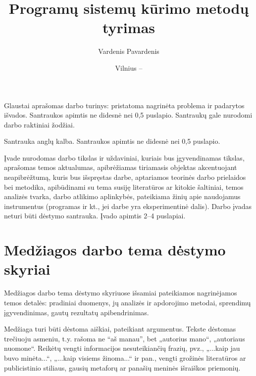 \documentclass{VUMIFPSbakalaurinis}
\institute{Informatikos institutas}  %
\title{Programų sistemų kūrimo metodų tyrimas}
\author{Vardenis Pavardenis}
\date{Vilnius – \the\year}
\begin{document}
\maketitle


Glaustai aprašomas darbo turinys: pristatoma nagrinėta problema ir padarytos
išvados. Santraukos apimtis ne didesnė nei 0,5 puslapio. Santraukų gale
nurodomi darbo raktiniai žodžiai.

Santrauka anglų kalba. Santraukos apimtis ne didesnė nei 0,5 puslapio.

\tableofcontents

Įvade nurodomas darbo tikslas ir uždaviniai, kuriais bus įgyvendinamas tikslas,
aprašomas temos aktualumas, apibrėžiamas tiriamasis objektas akcentuojant
neapibrėžtumą, kuris bus išspręstas darbe, aptariamos teorinės darbo prielaidos
bei metodika, apibūdinami su tema susiję literatūros ar kitokie šaltiniai,
temos analizės tvarka, darbo atlikimo aplinkybės, pateikiama žinių apie
naudojamus instrumentus (programas ir kt., jei darbe yra eksperimentinė dalis).
Darbo įvadas neturi būti dėstymo santrauka. Įvado apimtis 2--4 puslapiai.

\section{Medžiagos darbo tema dėstymo skyriai}
Medžiagos darbo tema dėstymo skyriuose išsamiai pateikiamos nagrinėjamos temos
detalės: pradiniai duomenys, jų analizės ir apdorojimo metodai, sprendimų
įgyvendinimas, gautų rezultatų apibendrinimas.

Medžiaga turi būti dėstoma aiškiai, pateikiant argumentus. Tekste dėstomas
trečiuoju asmeniu, t.y. rašoma ne \enquote{aš manau}, bet „autorius mano“, „autoriaus
nuomone“. Reikėtų vengti informacijos nesuteikiančių frazių, pvz., „...kaip jau
buvo minėta...“, „...kaip visiems žinoma...“ ir pan., vengti grožinės
literatūros ar publicistinio stiliaus, gausių metaforų ar panašių meninės
išraiškos priemonių.
\end{document}
